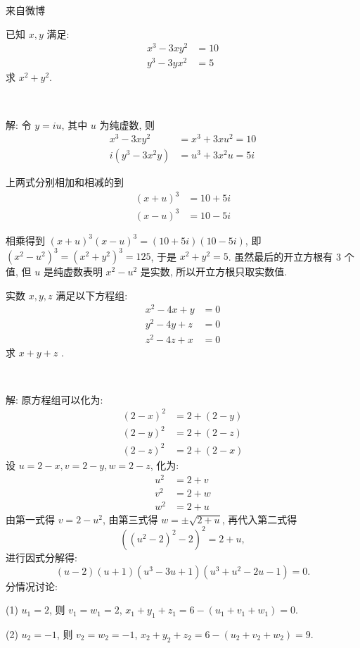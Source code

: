 \newpage
\noindent 来自微博

已知 $x,y$ 满足:
\begin{align*}
x^3-3xy^2&=10\\
y^3-3yx^2&=5
\end{align*}
求 $x^2+y^2$.

~

解: 令 $y = iu$, 其中 $u$ 为纯虚数, 则 
\begin{align*} 
x^3-3xy^2 &= x^3+3xu^2=10\\
i(y^3-3x^2y) &= u^3+3x^2u=5i
\end{align*}

上两式分别相加和相减的到
\begin{align*}
(x+u)^3 & =10+5i\\
(x-u)^3 &= 10-5i
\end{align*}

相乘得到 $(x+u)^3(x-u)^3=(10+5i)(10-5i)$, 即 $(x^2-u^2)^3=(x^2+y^2)^3=125$, 于是 $x^2+y^2=5$. 虽然最后的开立方根有 3 个值, 但 $u$ 是纯虚数表明 $x^2-u^2$ 是实数, 所以开立方根只取实数值.


\newpage
实数 $x,y,z$ 满足以下方程组:
\begin{align*}
x^2 - 4x + y &= 0 \\
y^2 - 4y + z &= 0\\
z^2 - 4z + x &= 0
\end{align*}
求 $x+y+z$ .

~

解: 原方程组可以化为:
\begin{align*}
(2-x)^2 &= 2 + (2-y) \\
(2-y)^2 &= 2 + (2-z)\\
(2-z)^2 &= 2 + (2-x)
\end{align*}
设 $u = 2-x, v = 2-y, w = 2-z$, 化为:
\begin{align*}
u^2 &= 2 + v \\
v^2 &= 2 + w\\
w^2 &= 2 + u
\end{align*}
由第一式得 $v = 2 - u^2$, 由第三式得 $w = \pm\sqrt{2+u}$, 再代入第二式得
\[((u^2-2)^2 - 2)^2 = 2+u  ,\]
进行因式分解得:
\[(u-2)(u+1)(u^3-3u+1)(u^3+u^2-2u-1) = 0 .\]
分情况讨论:

(1) $u_1 = 2$, 则 $v_1 = w_1 = 2$, $x_1+y_1+z_1 = 6 - (u_1+v_1+w_1) = 0.$

(2) $u_2 = -1$, 则 $v_2 = w_2 = -1$, $x_2+y_2+z_2 = 6 - (u_2+v_2+w_2) = 9.$

